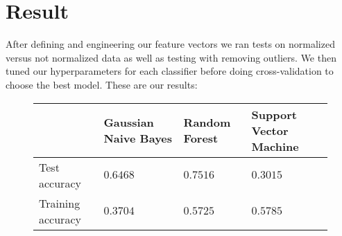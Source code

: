 \section{Result}

After defining and engineering our feature vectors we ran tests on normalized versus not normalized data as well as testing with removing outliers. We then tuned our hyperparameters for each classifier before doing cross-validation to choose the best model. These are our results:
\begin{figure}[!ht]
    \centering
    \begin{tabular}{|l|l|l|l|}
        \hline
        \rowcolor{gray!50}
        & Gaussian Naive Bayes & Random Forest & Support Vector Machine \\ \hline
        Test accuracy & $0.6468$ & $0.7516$ & $0.3015$ \\ \hline
        Training accuracy & $0.3704$ & $0.5725$ & $0.5785$ \\ \hline
    \end{tabular}
\end{figure}